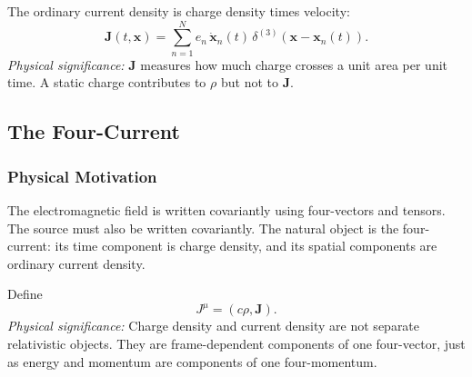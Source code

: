 The ordinary current density is charge density times velocity:
\begin{equation}\label{eq:lec09-J-def}
  \boxed{
  \mathbf{J}(t,\mathbf{x})
  =
  \sum_{n=1}^N e_n\,\dot{\mathbf{x}}_n(t)\,
  \delta^{(3)}\!\left(\mathbf{x}-\mathbf{x}_n(t)\right).
  }
\end{equation}
\textit{Physical significance:} $\mathbf{J}$ measures how much charge crosses a
unit area per unit time.  A static charge contributes to $\rho$ but not to
$\mathbf{J}$.

\begin{center}
\end{center}

\subsection{The Four-Current}\label{subsec:lec09-four-current}

\subsubsection*{Physical Motivation}
The electromagnetic field is written covariantly using four-vectors and tensors.
The source must also be written covariantly.  The natural object is the
four-current: its time component is charge density, and its spatial components
are ordinary current density.

Define
\begin{equation}\label{eq:lec09-four-current-components}
  \boxed{
  J^\mu=(c\rho,\mathbf{J}).
  }
\end{equation}
\textit{Physical significance:} Charge density and current density are not
separate relativistic objects.  They are frame-dependent components of one
four-vector, just as energy and momentum are components of one four-momentum.

